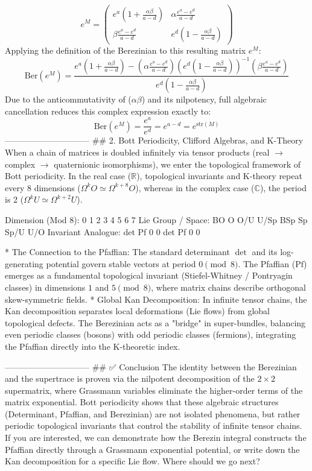 $$e^M = \begin{pmatrix} e^a \left(1 + \frac{\alpha\beta}{a-d}\right) & \alpha \frac{e^a - e^d}{a-d} \\ \beta \frac{e^a - e^d}{a-d} & e^d \left(1 - \frac{\alpha\beta}{a-d}\right) \end{pmatrix}$$ 
Applying the definition of the Berezinian to this resulting matrix $e^M$:
$$\text{Ber}(e^M) = \frac{e^a \left(1 + \frac{\alpha\beta}{a-d}\right) - \left(\alpha \frac{e^a - e^d}{a-d}\right) \left(e^d \left(1 - \frac{\alpha\beta}{a-d}\right)\right)^{-1} \left(\beta \frac{e^a - e^d}{a-d}\right)}{e^d \left(1 - \frac{\alpha\beta}{a-d}\right)}$$ 
Due to the anticommutativity of ($\alpha\beta$) and its nilpotency, full algebraic cancellation reduces this complex expression exactly to:
$$\text{Ber}(e^M) = \frac{e^a}{e^d} = e^{a-d} = e^{\text{str}(M)}$$ 
------------------------------
## 2. Bott Periodicity, Clifford Algebras, and K-Theory
When a chain of matrices is doubled infinitely via tensor products (real $\rightarrow$ complex $\rightarrow$ quaternionic isomorphisms), we enter the topological framework of Bott periodicity.
In the real case ($\mathbb{R}$), topological invariants and K-theory repeat every 8 dimensions ($\Omega^k O \simeq \Omega^{k+8} O$), whereas in the complex case ($\mathbb{C}$), the period is 2 ($\Omega^k U \simeq \Omega^{k+2} U$).

Dimension (Mod 8):  0     1     2     3     4     5     6     7
Lie Group / Space:  BO    O     O/U   U/Sp  BSp   Sp    Sp/U  U/O
Invariant Analogue: det   Pf    0     0     det   Pf    0     0


* The Connection to the Pfaffian: The standard determinant $\det$ and its log-generating potential govern stable vectors at period $0 \pmod 8$. The Pfaffian ($\text{Pf}$) emerges as a fundamental topological invariant (Stiefel-Whitney / Pontryagin classes) in dimensions $1$ and $5 \pmod 8$, where matrix chains describe orthogonal skew-symmetric fields.
* Global Kan Decomposition: In infinite tensor chains, the Kan decomposition separates local deformations (Lie flows) from global topological defects. The Berezinian acts as a "bridge" in super-bundles, balancing even periodic classes (bosons) with odd periodic classes (fermions), integrating the Pfaffian directly into the K-theoretic index.

------------------------------
## ✅ Conclusion
The identity between the Berezinian and the supertrace is proven via the nilpotent decomposition of the $2 \times 2$ supermatrix, where Grassmann variables eliminate the higher-order terms of the matrix exponential. Bott periodicity shows that these algebraic structures (Determinant, Pfaffian, and Berezinian) are not isolated phenomena, but rather periodic topological invariants that control the stability of infinite tensor chains.
If you are interested, we can demonstrate how the Berezin integral constructs the Pfaffian directly through a Grassmann exponential potential, or write down the Kan decomposition for a specific Lie flow. Where should we go next?

